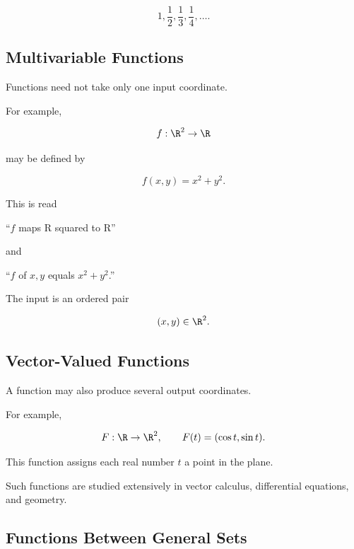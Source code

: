 \[ 1,\frac12,\frac13,\frac14,\ldots. \]

\subsection{Multivariable Functions}
\label{subsec:multivariable-functions}

Functions need not take only one input coordinate.

For example,

\[ f:\R^2\to\R \]

may be defined by

\[ f(x,y)=x^2+y^2. \]

This is read

\begin{center}
``\(f\) maps R squared to R''
\end{center}

and

\begin{center}
``\(f\) of \(x,y\) equals \(x^2+y^2\).''
\end{center}

The input is an ordered pair

\[ (x,y)\in\R^2. \]

\subsection{Vector-Valued Functions}
\label{subsec:vector-valued-functions}

A function may also produce several output coordinates.

For example,

\[ F:\R\to\R^2,\qquad F(t)=(\cos t,\sin t). \]

This function assigns each real number \(t\) a point in the plane.

Such functions are studied extensively in vector calculus, differential
equations, and geometry.

\subsection{Functions Between General Sets}
\label{subsec:functions-general-sets}

